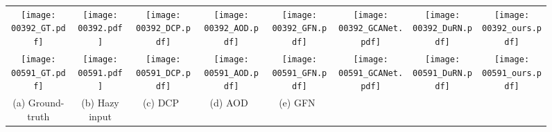 \documentclass[10pt,twocolumn,letterpaper]{article}
\begin{document}
\begin{figure*}[!t]
    \centering
    \LARGE
  
    \begin{adjustbox}{width=\linewidth}
      \begin{tabular}{cccccccc}
\texttt{[image: 00392\_GT.pdf]} & \hspace{-4mm}
        \texttt{[image: 00392.pdf]} & \hspace{-4mm}
        \texttt{[image: 00392\_DCP.pdf]} & \hspace{-4mm}
        \texttt{[image: 00392\_AOD.pdf]} & \hspace{-4mm}
        \texttt{[image: 00392\_GFN.pdf]} & \hspace{-4mm}
        \texttt{[image: 00392\_GCANet.pdf]} & \hspace{-4mm}
          \texttt{[image: 00392\_DuRN.pdf]} & \hspace{-4mm}
          \texttt{[image: 00392\_ours.pdf]}
          \\
          \texttt{[image: 00591\_GT.pdf]} & \hspace{-4mm}
          \texttt{[image: 00591.pdf]} & \hspace{-4mm}
          \texttt{[image: 00591\_DCP.pdf]} & \hspace{-4mm}
          \texttt{[image: 00591\_AOD.pdf]} & \hspace{-4mm}
          \texttt{[image: 00591\_GFN.pdf]} & \hspace{-4mm}
          \texttt{[image: 00591\_GCANet.pdf]} & \hspace{-4mm}
            \texttt{[image: 00591\_DuRN.pdf]} & \hspace{-4mm}
            \texttt{[image: 00591\_ours.pdf]}        \\
\hspace{-3mm}
          (a) Ground-truth & \hspace{-4mm}
          (b) Hazy input & \hspace{-4mm}
          (c) DCP~\cite{He_dark}  & \hspace{-4mm}
          (d) AOD~\cite{AOD} & \hspace{-4mm}
          (e) GFN~\cite{GFN} & \hspace{-4mm}

\end{tabular}
\end{adjustbox}
\end{figure*}
\end{document}
